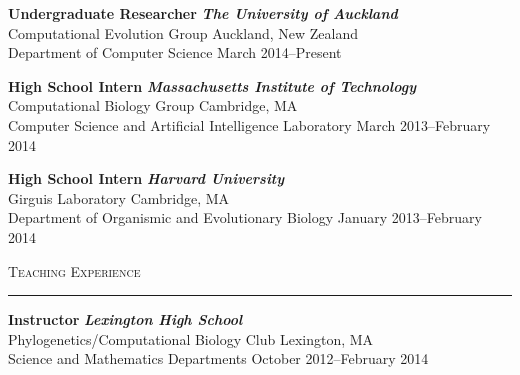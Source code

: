 \documentclass[11pt,letterpaper]{article}
\begin{document}
\begin{flushleft}
\begin{adjustwidth}{1em}{1em}

\textbf{Undergraduate Researcher} \hfill \textbf{\emph{The University of Auckland}} \\
Computational Evolution Group \hfill Auckland, New Zealand \\
Department of Computer Science \hfill March 2014--Present

\textbf{High School Intern} \hfill \textbf{\emph{Massachusetts Institute of Technology}} \\
Computational Biology Group \hfill Cambridge, MA \\
Computer Science and Artificial Intelligence Laboratory \hfill March 2013--February 2014

\textbf{High School Intern} \hfill \textbf{\emph{Harvard University}} \\
Girguis Laboratory \hfill Cambridge, MA \\
Department of Organismic and Evolutionary Biology \hfill January 2013--February 2014 \\

\end{adjustwidth}

\LARGE \textsc{Teaching Experience} \\ \vspace{11pt} \hrule \normalsize \vspace{0.5\baselineskip}

\begin{adjustwidth}{1em}{1em}


\textbf{Instructor} \hfill \textbf{\emph{Lexington High School}} \\
Phylogenetics/Computational Biology Club \hfill Lexington, MA \\
Science and Mathematics Departments \hfill October 2012--February 2014 


\end{adjustwidth}
\end{flushleft}
\end{document}

